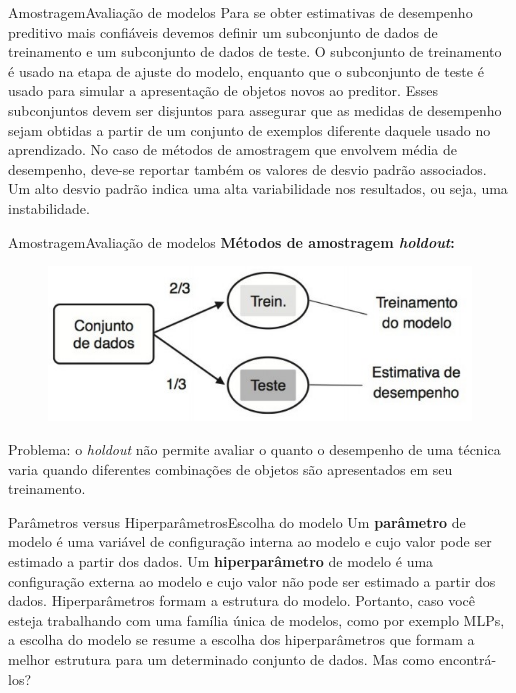 \documentclass[t]{beamer}
\begin{document}

\begin{ftst}{Amostragem}{Avaliação de modelos}
\justifying
\small
Para se obter estimativas de desempenho preditivo mais confiáveis devemos definir um subconjunto de dados de treinamento e um subconjunto de dados de teste.
\vone
O subconjunto de treinamento é usado na etapa de ajuste do modelo, enquanto que o subconjunto de teste é usado para simular a apresentação de objetos novos ao preditor.
\vone
Esses subconjuntos devem ser disjuntos para assegurar que as medidas de desempenho sejam obtidas a partir de um conjunto de exemplos diferente daquele usado no aprendizado.
\vone
No caso de métodos de amostragem que envolvem média de desempenho, deve-se reportar também os valores de desvio padrão associados. Um alto desvio padrão indica uma alta variabilidade nos resultados, ou seja, uma instabilidade.

\end{ftst}


\begin{ftst}{Amostragem}{Avaliação de modelos}
\justifying
\textbf{Métodos de amostragem \textit{holdout}:}
\vone
\begin{figure}
    \centering
    \includegraphics[scale=0.7]{Figuras/slide04_02.jpg}
\end{figure}

Problema: o \textit{holdout} não permite avaliar o quanto o desempenho de uma técnica varia quando diferentes combinações de objetos são apresentados em seu treinamento.

\end{ftst}



\begin{ftst}{Parâmetros versus Hiperparâmetros}{Escolha do modelo}
\justifying
Um \textbf{parâmetro} de modelo é uma variável de configuração interna ao modelo e cujo valor pode ser estimado a partir dos dados.
\vone
Um \textbf{hiperparâmetro} de modelo é uma configuração externa ao modelo e cujo valor não pode ser estimado a partir dos dados. Hiperparâmetros formam a estrutura do modelo.
\vone
Portanto, caso você esteja trabalhando com uma família única de modelos, como por exemplo MLPs, a escolha do modelo se resume a escolha dos hiperparâmetros que formam a melhor estrutura para um determinado conjunto de dados. 
\vone
Mas como encontrá-los?

\end{ftst}
\end{document}

